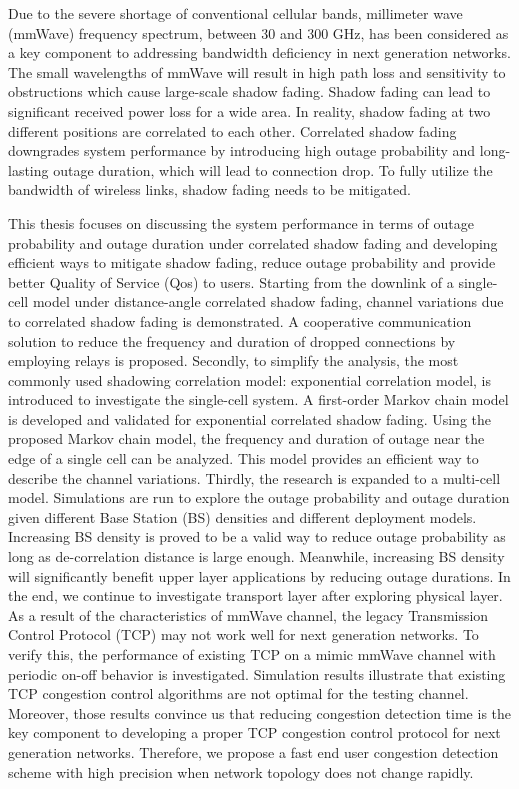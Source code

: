\par Due to the severe shortage of conventional cellular bands, millimeter wave (mmWave) frequency spectrum, between 30 and 300 GHz, has been considered as a key component to addressing bandwidth deficiency in next generation networks. The small wavelengths of mmWave will result in high path loss and sensitivity to obstructions which cause large-scale shadow fading. Shadow fading can lead to significant received power loss for a wide area. In reality, shadow fading at two different positions are correlated to each other. Correlated shadow fading downgrades system performance by introducing high outage probability and long-lasting outage duration, which will lead to connection drop. To fully utilize the bandwidth of wireless links, shadow fading needs to be mitigated.
\par This thesis focuses on discussing the system performance in terms of outage probability and outage duration under correlated shadow fading and developing efficient ways to mitigate shadow fading, reduce outage probability and provide better Quality of Service (Qos) to users. Starting from the downlink of a single-cell model under distance-angle correlated shadow fading, channel variations due to correlated shadow fading is demonstrated. A cooperative communication solution to reduce the frequency and duration of dropped connections by employing relays is proposed. Secondly, to simplify the analysis, the most commonly used shadowing correlation model: exponential correlation model, is introduced to investigate the single-cell system. A first-order Markov chain model is developed and validated for exponential correlated shadow fading. Using the proposed Markov chain model, the frequency and duration of outage near the edge of a single cell can be analyzed. This model provides an efficient way to describe the channel variations. Thirdly, the research is expanded to a multi-cell model. Simulations are run to explore the outage probability and outage duration given different Base Station (BS) densities and different deployment models. Increasing BS density is proved to be a valid way to reduce outage probability as long as de-correlation distance is large enough. Meanwhile, increasing BS density will significantly benefit upper layer applications by reducing outage durations. In the end, we continue to investigate transport layer after exploring physical layer. As a result of the characteristics of mmWave channel, the legacy Transmission Control Protocol (TCP) may not work well for next generation networks. To verify this, the performance of existing TCP on a mimic mmWave channel with periodic on-off behavior is investigated. Simulation results illustrate that existing TCP congestion control algorithms are not optimal for the testing channel. Moreover, those results convince us that reducing congestion detection time is the key component to developing a proper TCP congestion control protocol for next generation networks. Therefore, we propose a fast end user congestion detection scheme with high precision when network topology does not change rapidly.


